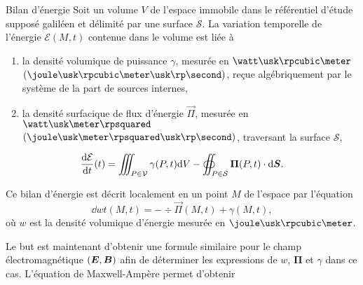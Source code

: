 \begin{defn}{Bilan d'énergie}
	Soit un volume $V$ de l'espace immobile 
	dans le référentiel d'étude supposé
	galiléen et délimité par une surface $\mathcal{S}$. La variation 
	temporelle de l'énergie $\mathcal{E}(M, t)$
	contenue dans le volume est liée à
	\begin{enumerate}
	\item la densité volumique de puissance
	$\gamma$, mesurée en $\watt \usk \rpcubic \meter$ 
	  $(\joule \usk \rpcubic \meter \usk \rp \second)$, 
	  reçue algébriquement par le système de la part de sources internes,
	
  	\item la densité surfacique de flux d'énergie $\vec{\Pi}$,
	  mesurée en $\watt \usk \meter \rpsquared$ 
	  $(\joule \usk \meter \rpsquared \usk \rp \second)$,
	  traversant la surface $\mathcal{S}$,
	\end{enumerate}
	
	\begin{equation}
		\dn{\mathcal{E}}{t}(t) = \iiint_{P \in \mathcal{V}} \gamma(P, t) \dV
		- \oiint_{P \in \mathcal{S}} \vec{\Pi}(P, t) \cdot \ds.
	\end{equation}

	Ce bilan d'énergie est décrit localement en un point $M$ de l'espace
	par l'équation
	\begin{equation}
		\dd{w}{t}(M, t) = -\div \vec{\Pi}(M, t) + \gamma(M, t),
	\end{equation}
	où $w$ est la densité volumique d'énergie 
	mesurée en $\joule \usk \rpcubic \meter$.
\end{defn}

Le but est maintenant d'obtenir une formule similaire pour le champ électromagnétique
$(\vece, \vecb)$ afin de déterminer les expressions de
$w$, $\mathbf{\Pi}$ et $\gamma$ dans ce cas. L'équation de Maxwell-Ampère 
permet d'obtenir

